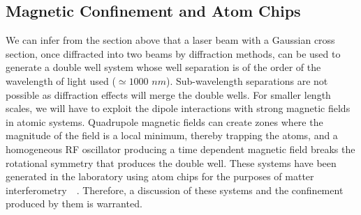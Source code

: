 \subsection{Magnetic Confinement and Atom Chips}
\label{chapter-intro:section:atomchip:subsec:2lvl}
We can infer from the section above that a laser beam with a Gaussian cross section, once diffracted into two beams by diffraction methods, can be used to generate a double well system whose well separation is of the order of the wavelength of light used ($\simeq 1000$ $nm$). Sub-wavelength separations are not possible as diffraction effects will merge the double wells. For smaller length scales, we will have to exploit the dipole interactions with strong magnetic fields in atomic systems. Quadrupole magnetic fields can create zones where the magnitude of the field is a local minimum, thereby trapping the atoms, and a homogeneous RF oscillator producing a time dependent magnetic field breaks the rotational symmetry that produces the double well. These systems have been generated in the laboratory using atom chips for the purposes of matter interferometry~\cite{doublewell:chip}~\cite{doublewell:chip:nature}. Therefore, a discussion of these systems and the confinement produced by them is warranted.

